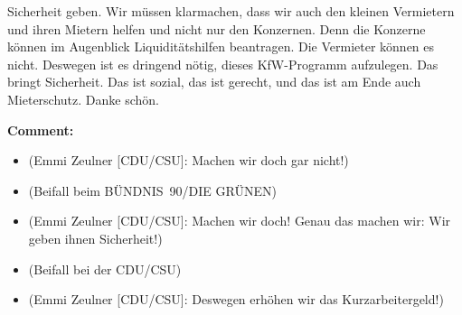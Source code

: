 \documentclass{article}
\begin{document}
Sicherheit geben.  Wir müssen klarmachen, dass wir auch den kleinen Vermietern und ihren Mietern helfen und nicht nur den Konzernen. Denn die Konzerne können im Augenblick Liquiditätshilfen beantragen. Die Vermieter können es nicht. Deswegen ist es dringend nötig, dieses KfW-Programm aufzulegen. Das bringt Sicherheit. Das ist sozial, das ist gerecht, und das ist am Ende auch Mieterschutz. Danke schön.  

\noindent\textbf{Comment:}
\begin{itemize}
    \setlength\itemsep{-3pt}
    \item (Emmi Zeulner [CDU/CSU]: Machen wir doch gar nicht!)
    \setlength\itemsep{-3pt}
    \item (Beifall beim BÜNDNIS 90/DIE GRÜNEN)
    \setlength\itemsep{-3pt}
    \item (Emmi Zeulner [CDU/CSU]: Machen wir doch! Genau das machen wir: Wir geben ihnen Sicherheit!)
    \setlength\itemsep{-3pt}
    \item (Beifall bei der CDU/CSU)
    \setlength\itemsep{-3pt}
    \item (Emmi Zeulner [CDU/CSU]: Deswegen erhöhen wir das Kurzarbeitergeld!)
\end{itemize}
\end{document}
